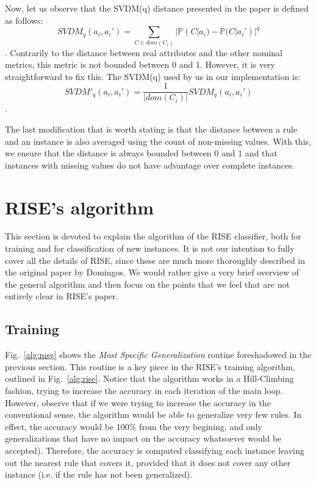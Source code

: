 \documentclass[a4paper]{article}
\begin{document}
Now, let us observe that the SVDM(q) distance presented in the paper is defined as follows:
\[ SVDM_q(a_i, a_i') = \sum_{C \in dom(C_i)} | \mathbb{P}(C|a_i) - \mathbb{P}(C|a_i') |^q \].
Contrarily to the distance between real attributes and the other nominal metrics, this metric is not bounded between 0 and 1. However, it is very straightforward to fix this. The SVDM(q) used by us in our implementation is:
\[ SVDM'_q(a_i, a_i') = \frac{1}{|dom(C_i)|} SVDM_q(a_i, a_i') \].

The last modification that is worth stating is that the distance between a rule and an instance is also averaged using the count of non-missing values. With this, we ensure that the distance is always bounded between 0 and 1 and that instances with missing values do not have advantage over complete instances.

\section{RISE's algorithm}
\label{sec:algorithm}

This section is devoted to explain the algorithm of the RISE classifier, both for training and for classification of new instances. It is not our intention to fully cover all the details of RISE, since these are much more thoroughly described in the original paper by Domingos. We would rather give a very brief overview of the general algorithm and then focus on the points that we feel that are not entirely clear in RISE's paper.

\subsection{Training}

Fig.~\ref{alg:msg} shows the \emph{Most Specific Generalization} routine foreshadowed in the previous section. This routine is a key piece in the RISE's training algorithm, outlined in Fig.~\ref{alg:rise}. Notice that the algorithm works in a Hill-Climbing fashion, trying to increase the accuracy in each iteration of the main loop. However, observe that if we were trying to increase the accuracy in the conventional sense, the algorithm would be able to generalize very few rules. In effect, the accuracy would be 100\% from the very begining, and only generalizations that have no impact on the accuracy whatsoever would be accepted). Therefore, the accuracy is computed classifying each instance leaving out the nearest rule that covers it, provided that it does not cover any other instance (i.e. if the rule has not been generalized).
\end{document}
